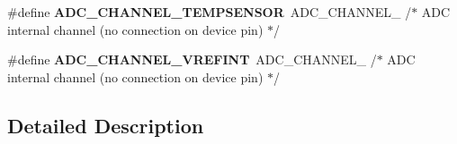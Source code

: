 \begin{DoxyCompactItemize}
\item 
\mbox{\label{group___a_d_c__channels_ga8f0da1e8fa8504c92a368f6eb8e229b3}} 
\#define {\bfseries A\+D\+C\+\_\+\+C\+H\+A\+N\+N\+E\+L\+\_\+\+T\+E\+M\+P\+S\+E\+N\+S\+OR}~A\+D\+C\+\_\+\+C\+H\+A\+N\+N\+E\+L\+\_  /$\ast$ A\+DC internal channel (no connection on device pin) $\ast$/
\item 
\mbox{\label{group___a_d_c__channels_ga2647a044275a295693e8fb01db3172f9}} 
\#define {\bfseries A\+D\+C\+\_\+\+C\+H\+A\+N\+N\+E\+L\+\_\+\+V\+R\+E\+F\+I\+NT}~A\+D\+C\+\_\+\+C\+H\+A\+N\+N\+E\+L\+\_  /$\ast$ A\+DC internal channel (no connection on device pin) $\ast$/
\end{DoxyCompactItemize}


\subsection{Detailed Description}
